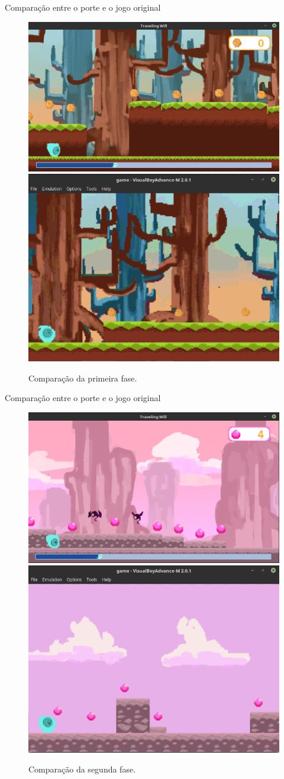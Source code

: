 \documentclass[notes, mathserif]{beamer}
\begin{document}
\begin{frame}{Compara\c c\~ao entre o porte e o jogo original}
	\begin{figure}%
    \includegraphics[width=.5\linewidth]{figuras/pc-fase1.png}
    \qquad
    \includegraphics[width=.4\linewidth]{figuras/gba-fase1.png}
    \caption{Compara\c c\~ao da primeira fase.}%
    \label{fig:comp1}%
	\end{figure}
\end{frame}

\begin{frame}{Compara\c c\~ao entre o porte e o jogo original}
	\begin{figure}%
    \includegraphics[width=.5\linewidth]{figuras/pc-fase2.png}
    \qquad
    \includegraphics[width=.4\linewidth]{figuras/gba-fase2.png}
    \caption{Compara\c c\~ao da segunda fase.}%
    \label{fig:comp1}%
	\end{figure}
\end{frame}
\end{document}
